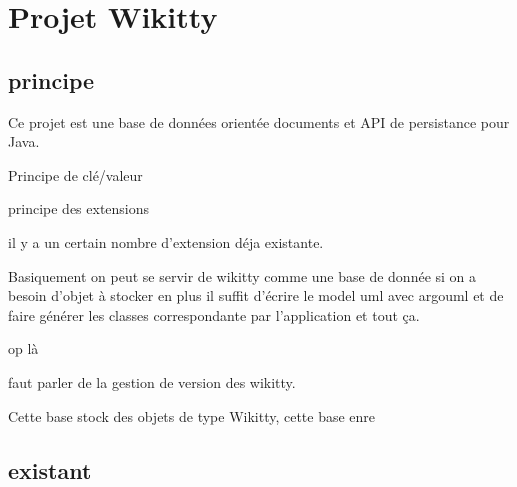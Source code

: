\section{Projet Wikitty}


\subsection{principe}

Ce projet est une base de données orientée documents et API de persistance pour
Java. 

Principe de clé/valeur

principe des extensions

il y a un certain nombre d'extension déja existante.

Basiquement on peut se servir de wikitty comme une base de donnée
si on a besoin d'objet à stocker en plus il suffit d'écrire le model
uml avec argouml et de faire générer les classes correspondante par
l'application et tout ça.

op là

faut parler de la gestion de version des wikitty.




Cette base stock des objets de type Wikitty, cette base enre


\subsection{existant}